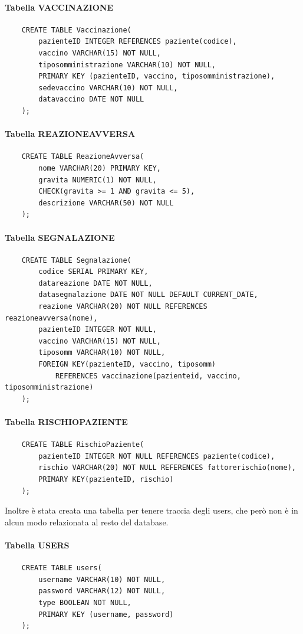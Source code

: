 \documentclass{article}
\begin{document}
\paragraph*{Tabella VACCINAZIONE}
\begin{verbatim}
    CREATE TABLE Vaccinazione(
        pazienteID INTEGER REFERENCES paziente(codice),
        vaccino VARCHAR(15) NOT NULL,
        tiposomministrazione VARCHAR(10) NOT NULL,
        PRIMARY KEY (pazienteID, vaccino, tiposomministrazione),
        sedevaccino VARCHAR(10) NOT NULL,
        datavaccino DATE NOT NULL
    );
\end{verbatim}
\paragraph*{Tabella REAZIONEAVVERSA}
\begin{verbatim}
    CREATE TABLE ReazioneAvversa(
        nome VARCHAR(20) PRIMARY KEY,
        gravita NUMERIC(1) NOT NULL,
        CHECK(gravita >= 1 AND gravita <= 5),
        descrizione VARCHAR(50) NOT NULL
    );
\end{verbatim}
\paragraph*{Tabella SEGNALAZIONE}
\begin{verbatim}
    CREATE TABLE Segnalazione(
        codice SERIAL PRIMARY KEY,
        datareazione DATE NOT NULL,
        datasegnalazione DATE NOT NULL DEFAULT CURRENT_DATE,
        reazione VARCHAR(20) NOT NULL REFERENCES reazioneavversa(nome),
        pazienteID INTEGER NOT NULL,
        vaccino VARCHAR(15) NOT NULL,
        tiposomm VARCHAR(10) NOT NULL,
        FOREIGN KEY(pazienteID, vaccino, tiposomm) 
            REFERENCES vaccinazione(pazienteid, vaccino, tiposomministrazione)
    );
\end{verbatim}
\paragraph*{Tabella RISCHIOPAZIENTE}
\begin{verbatim}
    CREATE TABLE RischioPaziente(
        pazienteID INTEGER NOT NULL REFERENCES paziente(codice),
        rischio VARCHAR(20) NOT NULL REFERENCES fattorerischio(nome),
        PRIMARY KEY(pazienteID, rischio)
    );
\end{verbatim}
Inoltre è stata creata una tabella per tenere traccia degli users, che però non è in alcun modo relazionata al resto del database.
\paragraph*{Tabella USERS}
\begin{verbatim}
    CREATE TABLE users(
        username VARCHAR(10) NOT NULL,
        password VARCHAR(12) NOT NULL,
        type BOOLEAN NOT NULL,
        PRIMARY KEY (username, password)
    );
\end{verbatim}
\end{document}
